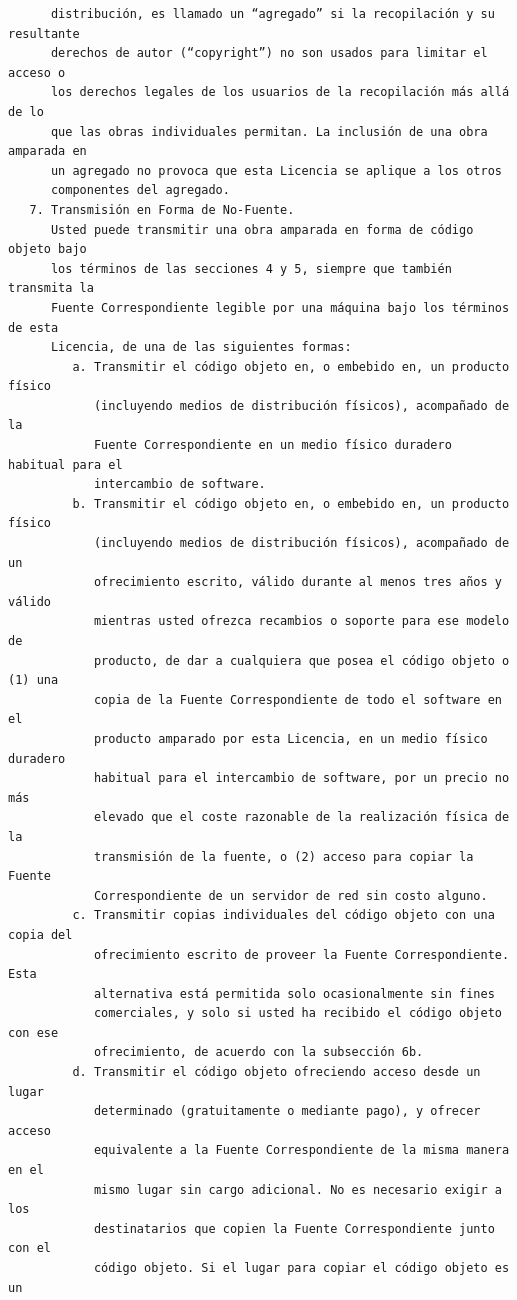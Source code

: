 \begin{verbatim}
      distribución, es llamado un “agregado” si la recopilación y su resultante
      derechos de autor (“copyright”) no son usados para limitar el acceso o
      los derechos legales de los usuarios de la recopilación más allá de lo
      que las obras individuales permitan. La inclusión de una obra amparada en
      un agregado no provoca que esta Licencia se aplique a los otros
      componentes del agregado.
   7. Transmisión en Forma de No-Fuente.
      Usted puede transmitir una obra amparada en forma de código objeto bajo
      los términos de las secciones 4 y 5, siempre que también transmita la
      Fuente Correspondiente legible por una máquina bajo los términos de esta
      Licencia, de una de las siguientes formas:
         a. Transmitir el código objeto en, o embebido en, un producto físico
            (incluyendo medios de distribución físicos), acompañado de la
            Fuente Correspondiente en un medio físico duradero habitual para el
            intercambio de software.
         b. Transmitir el código objeto en, o embebido en, un producto físico
            (incluyendo medios de distribución físicos), acompañado de un
            ofrecimiento escrito, válido durante al menos tres años y válido
            mientras usted ofrezca recambios o soporte para ese modelo de
            producto, de dar a cualquiera que posea el código objeto o (1) una
            copia de la Fuente Correspondiente de todo el software en el
            producto amparado por esta Licencia, en un medio físico duradero
            habitual para el intercambio de software, por un precio no más
            elevado que el coste razonable de la realización física de la
            transmisión de la fuente, o (2) acceso para copiar la Fuente
            Correspondiente de un servidor de red sin costo alguno.
         c. Transmitir copias individuales del código objeto con una copia del
            ofrecimiento escrito de proveer la Fuente Correspondiente. Esta
            alternativa está permitida solo ocasionalmente sin fines
            comerciales, y solo si usted ha recibido el código objeto con ese
            ofrecimiento, de acuerdo con la subsección 6b.
         d. Transmitir el código objeto ofreciendo acceso desde un lugar
            determinado (gratuitamente o mediante pago), y ofrecer acceso
            equivalente a la Fuente Correspondiente de la misma manera en el
            mismo lugar sin cargo adicional. No es necesario exigir a los
            destinatarios que copien la Fuente Correspondiente junto con el
            código objeto. Si el lugar para copiar el código objeto es un

\end{verbatim}
